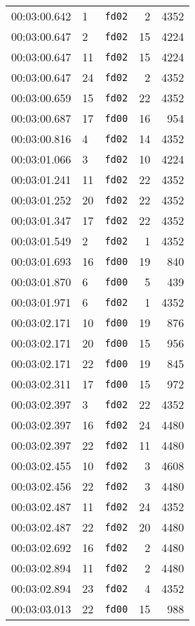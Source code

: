 \documentclass{article}
\begin{document}
\begin{longtable}{lllrr}
00:03:00.642 & 1 & \texttt{fd02} & 2 & 4352 \\
00:03:00.647 & 2 & \texttt{fd02} & 15 & 4224 \\
00:03:00.647 & 11 & \texttt{fd02} & 15 & 4224 \\
00:03:00.647 & 24 & \texttt{fd02} & 2 & 4352 \\
00:03:00.659 & 15 & \texttt{fd02} & 22 & 4352 \\
00:03:00.687 & 17 & \texttt{fd00} & 16 & 954 \\
00:03:00.816 & 4 & \texttt{fd02} & 14 & 4352 \\
00:03:01.066 & 3 & \texttt{fd02} & 10 & 4224 \\
00:03:01.241 & 11 & \texttt{fd02} & 22 & 4352 \\
00:03:01.252 & 20 & \texttt{fd02} & 22 & 4352 \\
00:03:01.347 & 17 & \texttt{fd02} & 22 & 4352 \\
00:03:01.549 & 2 & \texttt{fd02} & 1 & 4352 \\
00:03:01.693 & 16 & \texttt{fd00} & 19 & 840 \\
00:03:01.870 & 6 & \texttt{fd00} & 5 & 439 \\
00:03:01.971 & 6 & \texttt{fd02} & 1 & 4352 \\
00:03:02.171 & 10 & \texttt{fd00} & 19 & 876 \\
00:03:02.171 & 20 & \texttt{fd00} & 15 & 956 \\
00:03:02.171 & 22 & \texttt{fd00} & 19 & 845 \\
00:03:02.311 & 17 & \texttt{fd00} & 15 & 972 \\
00:03:02.397 & 3 & \texttt{fd02} & 22 & 4352 \\
00:03:02.397 & 16 & \texttt{fd02} & 24 & 4480 \\
00:03:02.397 & 22 & \texttt{fd02} & 11 & 4480 \\
00:03:02.455 & 10 & \texttt{fd02} & 3 & 4608 \\
00:03:02.456 & 22 & \texttt{fd02} & 3 & 4480 \\
00:03:02.487 & 11 & \texttt{fd02} & 24 & 4352 \\
00:03:02.487 & 22 & \texttt{fd02} & 20 & 4480 \\
00:03:02.692 & 16 & \texttt{fd02} & 2 & 4480 \\
00:03:02.894 & 11 & \texttt{fd02} & 2 & 4480 \\
00:03:02.894 & 23 & \texttt{fd02} & 4 & 4352 \\
00:03:03.013 & 22 & \texttt{fd00} & 15 & 988 \\

\end{longtable}
\end{document}

